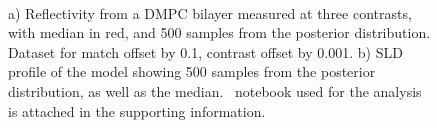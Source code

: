 \documentclass[12pt]{article}
\begin{document}
\begin{figure}%
\centering
{}\hspace{1em}%
\\%
\caption{a) Reflectivity from a DMPC bilayer measured at three contrasts, with median in red, and 500 samples from the posterior distribution. Dataset for  match offset by 0.1,  contrast offset by 0.001. b) SLD profile of the  model showing 500 samples from the posterior distribution, as well as the median. \Jupyter\ notebook used for the analysis is attached in the supporting information.}
\end{figure}
\end{document}
